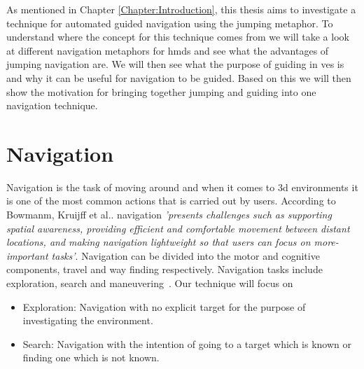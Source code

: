 \label{Chapter:Related Work}
As mentioned in Chapter \ref{Chapter:Introduction}, this thesis aims to investigate a technique for automated guided navigation using the jumping metaphor. To understand where the concept for this technique comes from we will take a look at different navigation metaphors for \acrshort{hmd}s and see what the advantages of jumping navigation are. We will then see what the purpose of guiding in \acrshort{ve}s is and why it can be useful for navigation to be guided. Based on this we will then show the motivation for bringing together jumping and guiding into one navigation technique. 

\section{Navigation}
\label{section:RW Navigation}

Navigation is the task of moving around and when it comes to \acrfull{3d} environments it is one of the most common actions that is carried out by users. According to Bowmanm, Kruijff et al.. navigation \textit{'presents challenges such as supporting spatial awareness, providing efficient and comfortable movement between distant locations, and making navigation lightweight so that users can focus on more-important tasks'}. Navigation can be divided into the motor and cognitive components, travel and way finding respectively. Navigation tasks include exploration, search and maneuvering~\cite{Bowman2001}. Our technique will focus on 
\begin{itemize}
	\item Exploration: Navigation with no explicit target for the purpose of investigating the environment.
	\item Search: Navigation with the intention of going to a target which is known or finding one which is not known.
\end{itemize}

